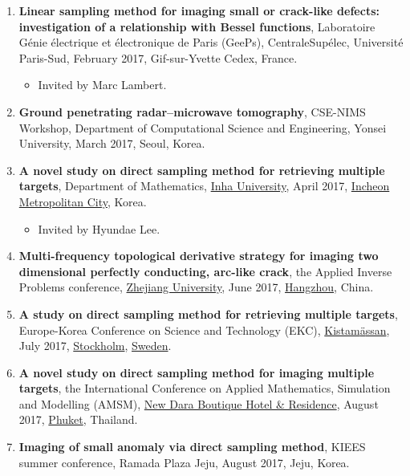 \documentclass[10pt,A4]{article}
\begin{document}
\begin{enumerate}
\item\label{P-SUPELEC2017} \textbf{Linear sampling method for imaging small or crack-like defects: investigation of a relationship with Bessel functions}, Laboratoire G{\'e}nie {\'e}lectrique et {\'e}lectronique de Paris (GeePs), CentraleSup{\'e}lec, Universit{\'e} Paris-Sud, February 2017, Gif-sur-Yvette Cedex, France.
\begin{itemize}
\item Invited by Marc Lambert.
\end{itemize}
\item\label{P-CSE2017A} \textbf{Ground penetrating radar--microwave tomography},  CSE-NIMS Workshop, Department of Computational Science and Engineering, Yonsei University, March 2017, Seoul, Korea.
\item\label{P-INHA2017} \textbf{A novel study on direct sampling method for retrieving multiple targets}, Department of Mathematics, \href{https://eng.inha.ac.kr/eng/index.do}{Inha University}, April 2017, \href{https://www.incheon.go.kr/en/index}{Incheon Metropolitan City}, Korea.
\begin{itemize}
\item Invited by Hyundae Lee.
\end{itemize}
\item\label{P-AIP2017} \textbf{Multi-frequency topological derivative strategy for imaging two dimensional perfectly conducting, arc-like crack}, the  Applied Inverse Problems conference, \href{http://www.zju.edu.cn/english/}{Zhejiang University}, June 2017, \href{http://www.hangzhou.gov.cn/}{Hangzhou}, China.
\item\label{P-EKC2017} \textbf{A study on direct sampling method for retrieving multiple targets}, Europe-Korea Conference on Science and Technology (EKC), \href{http://www.kistamassan.se/en}{Kistam{\"a}ssan}, July 2017, \href{https://www.visitstockholm.com}{Stockholm}, \href{https://sweden.se}{Sweden}.
\item\label{P-AMSM2017} \textbf{A novel study on direct sampling method for imaging multiple targets}, the  International Conference on Applied Mathematics, Simulation and Modelling (AMSM), \href{http://www.daraphuket.com/}{New Dara Boutique Hotel \& Residence}, August 2017, \href{https://www.tourismthailand.org/Destinations/Provinces/Phuket/350}{Phuket}, Thailand.
\item\label{P-KIEES2017A} \textbf{Imaging of small anomaly via direct sampling method}, KIEES summer conference, Ramada Plaza Jeju, August 2017, Jeju, Korea.

\end{enumerate}
\end{document}

